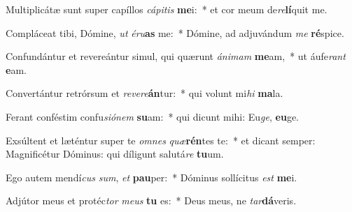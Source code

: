 \item Multiplicátæ sunt super capíllos \textit{cá}\textit{pi}\textit{tis} \textbf{me}i:~* et cor meum de\textit{re}\textbf{lí}quit me.
\item Compláceat tibi, Dómine, \textit{ut} \textit{é}\textit{ru}\textbf{as} me:~* Dómine, ad adjuvándum \textit{me} \textbf{ré}spice.
\item Confundántur et revereántur simul, qui quærunt \textit{á}\textit{ni}\textit{mam} \textbf{me}am,~* ut áufe\textit{rant} \textbf{e}am.
\item Convertántur retrórsum et \textit{re}\textit{ve}\textit{re}\textbf{án}tur:~* qui volunt mi\textit{hi} \textbf{ma}la.
\item Ferant conféstim confu\textit{si}\textit{ó}\textit{nem} \textbf{su}am:~* qui dicunt mihi: Eu\textit{ge}, \textbf{eu}ge.
\item Exsúltent et læténtur super te \textit{om}\textit{nes} \textit{quæ}\textbf{rén}tes te:~* et dicant semper: Magnificétur Dóminus: qui díligunt salutá\textit{re} \textbf{tu}um.
\item Ego autem mendí\textit{cus} \textit{sum}, \textit{et} \textbf{pau}per:~* Dóminus sollícitus \textit{est} \textbf{me}i.
\item Adjútor meus et protéc\textit{tor} \textit{me}\textit{us} \textbf{tu} es:~* Deus meus, ne \textit{tar}\textbf{dá}veris.
